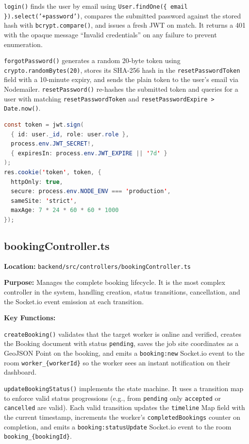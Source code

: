 \documentclass[12pt,a4paper]{report}
\begin{document}
\texttt{login()} finds the user by email using \texttt{User.findOne(\{ email \}).select('+password')}, compares the submitted password against the stored hash with \texttt{bcrypt.compare()}, and issues a fresh JWT on match. It returns a 401 with the opaque message ``Invalid credentials'' on any failure to prevent enumeration.

\texttt{forgotPassword()} generates a random 20-byte token using \texttt{crypto.randomBytes(20)}, stores its SHA-256 hash in the \texttt{resetPasswordToken} field with a 10-minute expiry, and sends the plain token to the user's email via Nodemailer. \texttt{resetPassword()} re-hashes the submitted token and queries for a user with matching \texttt{resetPasswordToken} and \texttt{resetPasswordExpire > Date.now()}.

\begin{lstlisting}[language=Java,caption={Register handler — token issuance}]
const token = jwt.sign(
  { id: user._id, role: user.role },
  process.env.JWT_SECRET!,
  { expiresIn: process.env.JWT_EXPIRE || '7d' }
);
res.cookie('token', token, {
  httpOnly: true,
  secure: process.env.NODE_ENV === 'production',
  sameSite: 'strict',
  maxAge: 7 * 24 * 60 * 60 * 1000
});
\end{lstlisting}

\subsection{bookingController.ts}

\textbf{Location:} \texttt{backend/src/controllers/bookingController.ts}

\textbf{Purpose:} Manages the complete booking lifecycle. It is the most complex controller in the system, handling creation, status transitions, cancellation, and the Socket.io event emission at each transition.

\textbf{Key Functions:}

\texttt{createBooking()} validates that the target worker is online and verified, creates the Booking document with status \texttt{pending}, saves the job site coordinates as a GeoJSON Point on the booking, and emits a \texttt{booking:new} Socket.io event to the room \texttt{worker\_\{workerId\}} so the worker sees an instant notification on their dashboard.

\texttt{updateBookingStatus()} implements the state machine. It uses a transition map to enforce valid status progressions (e.g., from \texttt{pending} only \texttt{accepted} or \texttt{cancelled} are valid). Each valid transition updates the \texttt{timeline} Map field with the current timestamp, increments the worker's \texttt{completedBookings} counter on completion, and emits a \texttt{booking:statusUpdate} Socket.io event to the room \texttt{booking\_\{bookingId\}}.
\end{document}
